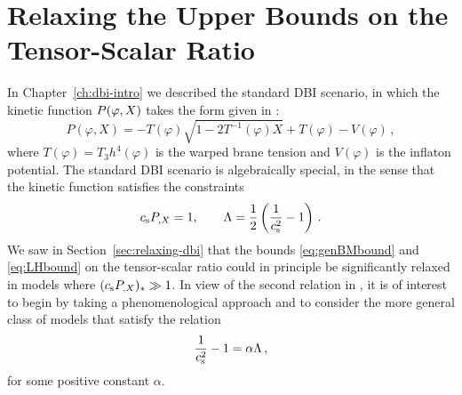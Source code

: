 % 
% 
\section{Relaxing the Upper Bounds on the Tensor-Scalar Ratio}
\label{sec:relaxing-multi}
% 
In Chapter~\ref{ch:dbi-intro} we described the standard DBI scenario, in
which the kinetic function $P(\varphi, X)$ takes the form given in
:
%  
\begin{equation}
\label{eq:DBIkinetic}
P (\varphi , X) = -T(\varphi ) \sqrt{1-2T^{-1}(\varphi ) X} + T(\varphi ) - V(\varphi ) \,,
\end{equation}
% 
where $T(\varphi ) = T_3 h^4 (\varphi )$ 
is the warped brane tension and  $V(\varphi )$ is the 
inflaton potential. The standard DBI scenario is
algebraically special, 
in the sense that the kinetic function satisfies the constraints 
% 
\begin{equation}
\label{eq:cspx1}
c_\mathrm{s} P_{,X} = 1 , \qquad  \Lambda = \frac{1}{2} \left( 
\frac{1}{c_\mathrm{s}^2} -1 \right) \,.
\end{equation}
% 
We saw in Section~\ref{sec:relaxing-dbi} that the 
bounds \eqref{eq:genBMbound} and \eqref{eq:LHbound} 
on the tensor-scalar ratio could in principle be 
significantly relaxed in models where $(c_\mathrm{s} P_{,X})_* \gg 1$. 
In view of the second relation in , it is of interest 
to begin by taking a phenomenological approach and to consider the more  
general class of models that satisfy the relation
%  
\begin{equation}
\label{eq:defalpha}
\frac{1}{c_\mathrm{s}^2} -1 = \alpha \Lambda \,,
\end{equation}
% 
for some positive constant $\alpha$. 

